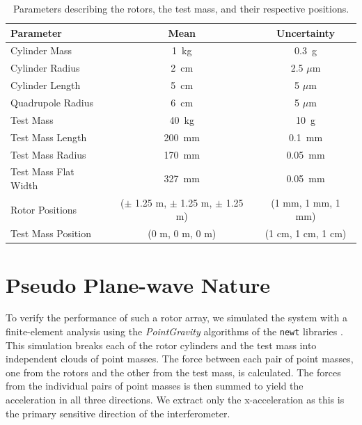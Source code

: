 \documentclass[superscriptaddress, twocolumn, prd]{revtex4-1}
\begin{document}
\begin{widetext}
\begingroup
\setlength{\tabcolsep}{10pt} %
\renewcommand{\arraystretch}{1.5} %

\begin{table}[h!]
\begin{center}
\begin{tabular}{ |l|c|c| }
\hline
 Parameter & Mean & Uncertainty \\
 \hline
Cylinder Mass & 1~kg & 0.3~g \\
Cylinder Radius & 2~cm & 2.5 $\mu$m \\
Cylinder Length & 5~cm & 5 $\mu$m \\
Quadrupole Radius & 6~cm & 5 $\mu$m \\
Test Mass & 40~kg & 10~g \\
Test Mass Length & 200~mm & 0.1~mm\\
Test Mass Radius & 170~mm & 0.05~mm\\
Test Mass Flat Width & 327~mm & 0.05~mm\\
Rotor Positions & ($\pm$ 1.25 m, $\pm$ 1.25 m, $\pm$ 1.25 m) & (1 mm, 1 mm, 1 mm) \\
Test Mass Position & (0 m, 0 m, 0 m) & (1 cm, 1 cm, 1 cm) \\
 \hline

 \end{tabular}
 \caption{Parameters describing the rotors, the test mass, and their respective positions.}\label{param}
 \end{center}

\end{table}
\endgroup
\end{widetext}

\section{Pseudo Plane-wave Nature}

To verify the performance of such a rotor array, we simulated the system with a finite-element analysis using the \textit{PointGravity} algorithms of the \texttt{newt} libraries \cite{Hagedorn, pgURL}. This simulation breaks each of the rotor cylinders and the test mass into independent clouds of point masses. The force between each pair of point masses, one from the rotors and the other from the test mass, is calculated. The forces from the individual pairs of point masses is then summed to yield the acceleration in all three directions. We extract only the x-acceleration as this is the primary sensitive direction of the interferometer.
\end{document}
